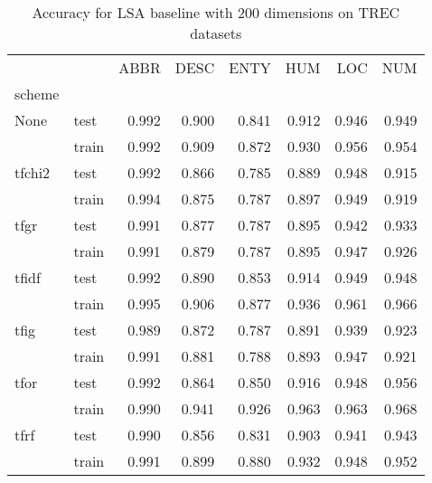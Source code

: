 \begin{table}[H]
\begin{center}

\begin{tabular}{llrrrrrr}
\toprule
{} &  &  ABBR &  DESC &  ENTY &  HUM &  LOC &  NUM \\
scheme &  &       &       &       &      &      &      \\
\midrule
None & test &     0.992 &     0.900 &     0.841 &    0.912 &    0.946 &    0.949 \\
{} & train &     0.992 &     0.909 &     0.872 &    0.930 &    0.956 &    0.954 \\
tfchi2 & test &     0.992 &     0.866 &     0.785 &    0.889 &    0.948 &    0.915 \\
{} & train &     0.994 &     0.875 &     0.787 &    0.897 &    0.949 &    0.919 \\
tfgr & test &     0.991 &     0.877 &     0.787 &    0.895 &    0.942 &    0.933 \\
{} & train &     0.991 &     0.879 &     0.787 &    0.895 &    0.947 &    0.926 \\
tfidf & test &     0.992 &     0.890 &     0.853 &    0.914 &    0.949 &    0.948 \\
{} & train &     0.995 &     0.906 &     0.877 &    0.936 &    0.961 &    0.966 \\
tfig & test &     0.989 &     0.872 &     0.787 &    0.891 &    0.939 &    0.923 \\
{} & train &     0.991 &     0.881 &     0.788 &    0.893 &    0.947 &    0.921 \\
tfor & test &     0.992 &     0.864 &     0.850 &    0.916 &    0.948 &    0.956 \\
{} & train &     0.990 &     0.941 &     0.926 &    0.963 &    0.963 &    0.968 \\
tfrf & test &     0.990 &     0.856 &     0.831 &    0.903 &    0.941 &    0.943 \\
{} & train &     0.991 &     0.899 &     0.880 &    0.932 &    0.948 &    0.952 \\
\bottomrule
\end{tabular}

\caption[Accuracy for LSA baseline with 200 dimensions on TREC datasets]{Accuracy for LSA baseline with 200 dimensions on TREC datasets}
\label{tab:lsa:resuts:abs:200:TREC}
\end{center}
\end{table}





